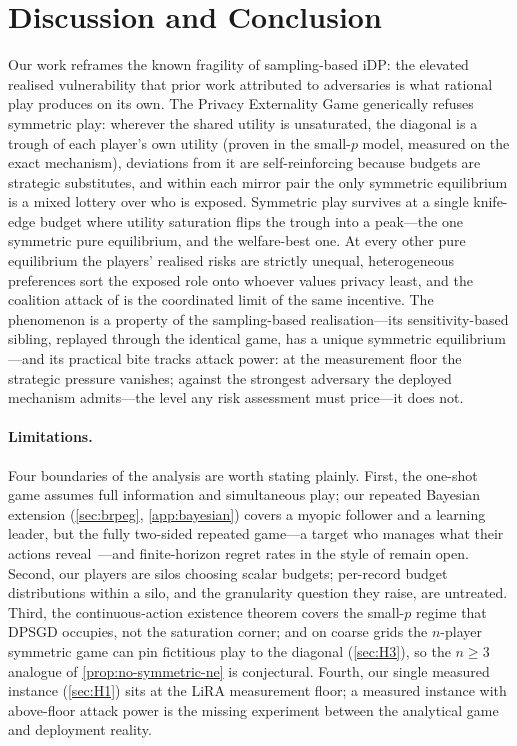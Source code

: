 \section{Discussion and Conclusion}
\label{sec:discussion}

Our work reframes the known fragility of sampling-based \ac{iDP}: the
elevated realised vulnerability that prior work attributed to adversaries is what
rational play produces on its own. The Privacy Externality Game
generically refuses symmetric play: wherever the shared utility is
unsaturated, the diagonal is a trough of each player's own utility
(proven in the small-$p$ model, measured on the exact mechanism),
deviations from it are self-reinforcing because budgets are
strategic substitutes, and within each mirror pair the only
symmetric equilibrium is a mixed lottery over who is exposed.
Symmetric play survives at a single knife-edge budget where utility
saturation flips the trough into a peak---the one symmetric pure
equilibrium, and the welfare-best one. At every other pure equilibrium
the players' realised risks are strictly unequal, heterogeneous preferences sort
the exposed role onto whoever values privacy least, and the coalition
attack of \citet{kaiser2026your} is the coordinated limit of the same
incentive. The phenomenon is a property of the sampling-based
realisation---its sensitivity-based sibling, replayed through the
identical game, has a unique symmetric equilibrium---and its practical
bite tracks attack power: at the measurement floor the
strategic pressure vanishes; against the strongest adversary the
deployed mechanism admits---the level any risk assessment must
price---it does not.

\paragraph{Limitations.} Four boundaries of the analysis are worth
stating plainly. First, the one-shot game assumes full information
and simultaneous play; our repeated Bayesian extension
(\cref{sec:brpeg}, \cref{app:bayesian}) covers a myopic follower and
a learning leader, but the fully two-sided repeated game---a target
who manages what their actions reveal~\cite{aumann1995repeated}---and
finite-horizon regret rates in the style of
\citet{balcan2015commitment} remain open. Second, our players are
silos choosing scalar budgets; per-record budget distributions within
a silo, and the granularity question they raise, are untreated.
Third, the continuous-action existence theorem covers the small-$p$
regime that \ac{DPSGD} occupies, not the saturation corner; and on coarse
grids the $n$-player symmetric game can pin fictitious play to the
diagonal (\cref{sec:H3}), so the $n \geq 3$ analogue of
\cref{prop:no-symmetric-ne} is conjectural. Fourth, our single
measured instance (\cref{sec:H1}) sits at the \ac{LiRA} measurement floor;
a measured instance with above-floor attack power is the missing
experiment between the analytical game and deployment reality.

